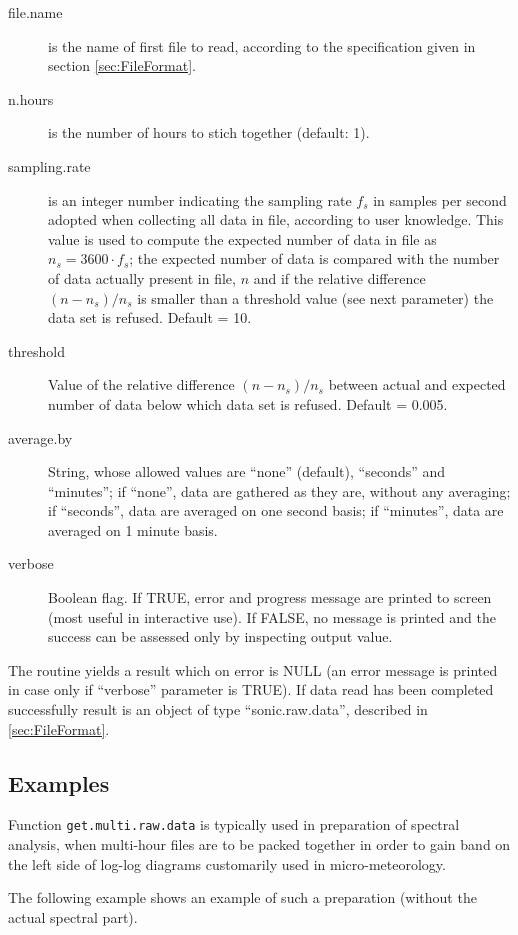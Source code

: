 \documentclass[a4paper,10pt]{book}
\begin{document}
\begin{description}
 \item[file.name] is the name of first file to read, according to the specification given in section \ref{sec:FileFormat}.
 \item[n.hours] is the number of hours to stich together (default: 1).
 \item[sampling.rate] is an integer number indicating the sampling rate $f_{s}$ in samples per second adopted when collecting all data in file, according to user knowledge. This value is used to compute the expected number of data in file as $n_{s} = 3600 \cdot f_{s}$; the expected number of data is compared with the number of data actually present in file, $n$ and if the relative difference $(n-n_{s})/n_{s}$ is smaller than a threshold value (see next parameter) the data set is refused. Default = 10.
 \item[threshold] Value of the relative difference $(n-n_{s})/n_{s}$ between actual and expected number of data below which data set is refused. Default = 0.005.
 \item[average.by] String, whose allowed values are ``none'' (default), ``seconds'' and ``minutes''; if ``none'', data are gathered as they are, without any averaging; if ``seconds'', data are averaged on one second basis; if ``minutes'', data are averaged on 1 minute basis.
 \item[verbose] Boolean flag. If TRUE, error and progress message are printed to screen (most useful in interactive use). If FALSE, no message is printed and the success can be assessed only by inspecting output value.
\end{description}

The routine yields a result which on error is NULL (an error message is printed in case only if ``verbose'' parameter is TRUE). If data read has been completed successfully result is an object of type ``sonic.raw.data'', described in \ref{sec:FileFormat}.

\subsection{Examples}

Function \verb|get.multi.raw.data| is typically used in preparation of spectral analysis, when multi-hour files are to be packed together in order to gain band on the left side of log-log diagrams customarily used in micro-meteorology.

The following example shows an example of such a preparation (without the actual spectral part).
\end{document}
